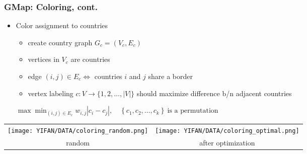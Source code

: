 \documentclass{beamer}
\begin{document}
\begin{frame}[plain]
\frametitle{ GMap: Coloring, cont.}
\begin{itemize}

\item Color assignment to countries
\begin{itemize}
\item create country graph $G_c=(V_c,E_c)$
\item vertices in $V_c$ are countries
\item edge $(i,j)\in E_c \iff$ countries $i$ and $j$ share a border
\item vertex labeling $c:V\rightarrow \{1,2, \dots, |V|\}$ should maximize difference b/n adjacent countries
\end{itemize}

\begin{block}{}
$\max  \min_{(i,j)\in E_c} w_{i,j} \left|c_i - c_j\right|,\quad\left\{c_1, c_2, \ldots, c_{k}\right\}\ \text{is\ a\ permutation}$
\end{block}


\end{itemize}

\begin{center}
\begin{table}
 \begin{tabular}{cc}
 \texttt{[image: YIFAN/DATA/coloring\_random.png]} &  \texttt{[image: YIFAN/DATA/coloring\_optimal.png]}\\
 random & after optimization\\
\end{tabular}
\end{table}
\end{center}

\end{frame}
\end{document}
